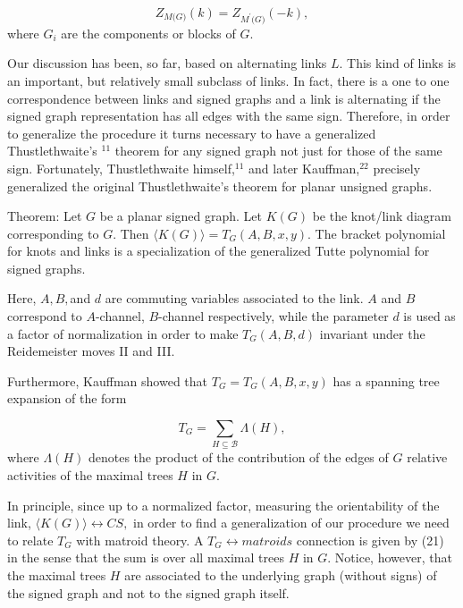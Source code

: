 \documentclass[a4paper,12pt]{article}
\begin{document}
\begin{equation}
Z_{M(\mathit{G)}}(k)=Z_{M^{\prime }(\mathit{G)}}(-k),  \label{20}
\end{equation}
where $\mathit{G}_{i}$ are the components or blocks of $\mathit{G.}$

Our discussion has been, so far, based on alternating links $L.$ This kind
of links is an important, but relatively small subclass of links. In fact,
there is a one to one correspondence between links and signed graphs and a
link is alternating if the signed graph representation has all edges with
the same sign. Therefore, in order to generalize the procedure it turns
necessary to have a generalized Thustlethwaite's $^{11}$ theorem for any
signed graph not just for those of the same sign. Fortunately,
Thustlethwaite himself,$^{11}$ and later Kauffman,$^{22}$ precisely
generalized the original Thustlethwaite's theorem for planar unsigned graphs.

Theorem: Let $G$ be a planar signed graph. Let $K(G)$ be the knot/link
diagram corresponding to $G$. Then $\langle K(G)\rangle =T_{G}(A,B,x,y)$.
The bracket polynomial for knots and links is a specialization of the
generalized Tutte polynomial for signed graphs.

Here, $A,B,$and $d$ are commuting variables associated to the link. $A$ and $%
B$ correspond to $A$-channel, $B$-channel respectively, while the parameter $%
d$ is used as a factor of normalization in order to make $T_{G}(A,B,d)$
invariant under the Reidemeister moves II and III.

Furthermore, Kauffman showed that $T_{G}=T_{G}(A,B,x,y)$ has a spanning tree
expansion of the form

\begin{equation}
T_{G}=\sum_{H\subseteq \mathcal{B}}\Lambda (H),  \label{21}
\end{equation}
where $\Lambda (H)$ denotes the product of the contribution of the edges of $%
G$ relative activities of the maximal trees $H$ in $G$.

In principle, since up to a normalized factor, measuring the orientability
of the link, $\langle K(G)\rangle \leftrightarrow CS,$ in order to find a
generalization of our procedure we need to relate $T_{G}$ with matroid
theory. A $T_{G}\longleftrightarrow matroids$ connection is given by (21) in
the sense that the sum is over all maximal trees $H$ in $G$. Notice,
however, that the maximal trees $H$ are associated to the underlying graph
(without signs) of the signed graph and not to the signed graph itself.
\end{document}
